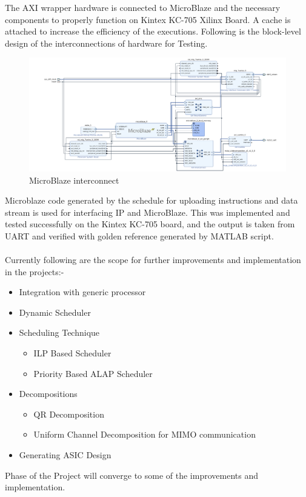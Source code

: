 The AXI wrapper hardware is connected to MicroBlaze and the necessary components to properly function on Kintex KC-705 Xilinx Board. A cache is attached to increase the efficiency of the executions. Following is the block-level design of the interconnections of hardware for Testing.\\



\begin{figure}[H]
    \centering
    \includegraphics[width = \textwidth]{./Software/Schematic_.png}
    \caption{MicroBlaze interconnect}
\end{figure}

\pagebreak
Microblaze code generated by the schedule for uploading instructions and data stream is used for interfacing IP and MicroBlaze. This was implemented and tested successfully on the Kintex KC-705 board, and the output is taken from UART and verified with golden reference generated by MATLAB script.
\\
\\
Currently following are the scope for further improvements and implementation in the projects:-
\begin{itemize}
    \item Integration with generic processor
    \item Dynamic Scheduler
    \item Scheduling Technique
    \begin{itemize}
        \item ILP Based Scheduler
        \item Priority Based ALAP Scheduler
    \end{itemize}
    \item Decompositions
    \begin{itemize}
        \item QR Decomposition
        \item Uniform Channel Decomposition for MIMO communication
    \end{itemize}
	\item Generating ASIC Design 
\end{itemize}
Phase  of the Project will converge to some of the improvements and implementation.